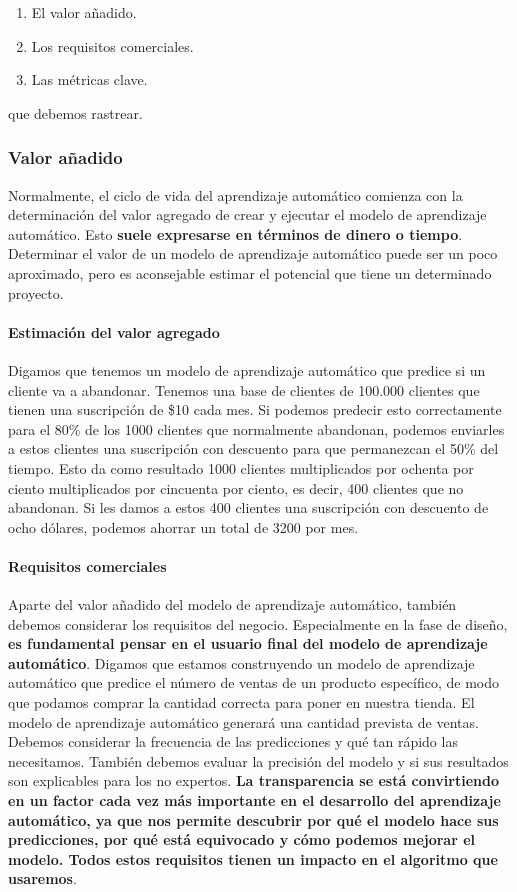 \documentclass[10pt]{book}
\begin{document}
\begin{enumerate}
	\item El valor añadido.
	\item Los requisitos comerciales.
	\item Las métricas clave.
\end{enumerate}
que debemos rastrear.

\subsubsection{Valor añadido}
Normalmente, el ciclo de vida del aprendizaje automático comienza con la determinación del valor agregado de crear y ejecutar el modelo de aprendizaje automático. Esto \textbf{suele expresarse en términos de dinero o tiempo}. Determinar el valor de un modelo de aprendizaje automático puede ser un poco aproximado, pero es aconsejable estimar el potencial que tiene un determinado proyecto.

\paragraph{Estimación del valor agregado}
Digamos que tenemos un modelo de aprendizaje automático que predice si un cliente va a abandonar. Tenemos una base de clientes de 100.000 clientes que tienen una suscripción de \$10 cada mes. Si podemos predecir esto correctamente para el 80\% de los 1000 clientes que normalmente abandonan, podemos enviarles a estos clientes una suscripción con descuento para que permanezcan el 50\% del tiempo. Esto da como resultado 1000 clientes multiplicados por ochenta por ciento multiplicados por cincuenta por ciento, es decir, 400 clientes que no abandonan. Si les damos a estos 400 clientes una suscripción con descuento de ocho dólares, podemos ahorrar un total de 3200 por mes.

\paragraph{Requisitos comerciales}
Aparte del valor añadido del modelo de aprendizaje automático, también debemos considerar los requisitos del negocio. Especialmente en la fase de diseño, \textbf{es fundamental pensar en el usuario final del modelo de aprendizaje automático}. Digamos que estamos construyendo un modelo de aprendizaje automático que predice el número de ventas de un producto específico, de modo que podamos comprar la cantidad correcta para poner en nuestra tienda. El modelo de aprendizaje automático generará una cantidad prevista de ventas. Debemos considerar la frecuencia de las predicciones y qué tan rápido las necesitamos. También debemos evaluar la precisión del modelo y si sus resultados son explicables para los no expertos. \textbf{La transparencia se está convirtiendo en un factor cada vez más importante en el desarrollo del aprendizaje automático, ya que nos permite descubrir por qué el modelo hace sus predicciones, por qué está equivocado y cómo podemos mejorar el modelo. Todos estos requisitos tienen un impacto en el algoritmo que usaremos}.
\end{document}
